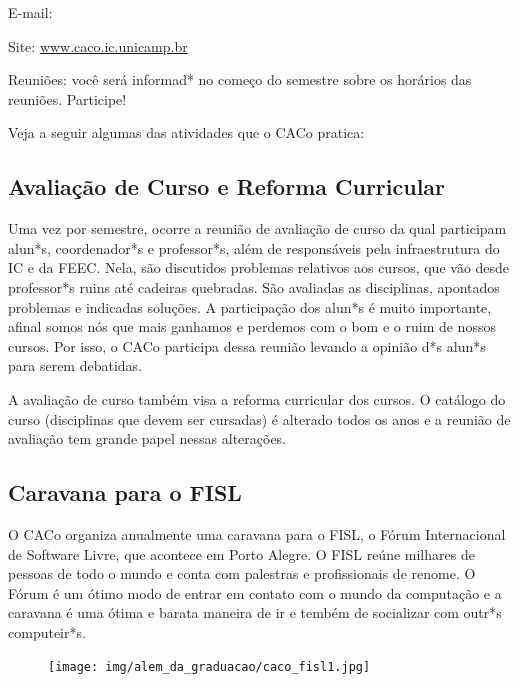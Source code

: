 \begin{compactitemize}
    \item  E-mail: 
    \item  Site: \url{www.caco.ic.unicamp.br}
    \item  Reuniões: você será informad* no começo do semestre sobre os horários
        das reuniões. Participe!
\end{compactitemize}

Veja a seguir algumas das atividades que o CACo pratica:

\subsection{Avaliação de Curso e Reforma Curricular}

Uma vez por semestre, ocorre a reunião de avaliação de curso da qual participam
alun*s, coordenador*s e professor*s, além de responsáveis pela infraestrutura do
IC e da FEEC. Nela, são discutidos problemas relativos aos cursos, que vão desde
professor*s ruins até cadeiras quebradas. São avaliadas as disciplinas,
apontados problemas e indicadas soluções. A participação dos alun*s é muito
importante, afinal somos nós que mais ganhamos e perdemos com o bom e o ruim de
nossos cursos. Por isso, o CACo participa dessa reunião levando a opinião d*s
alun*s para serem debatidas.

A avaliação de curso também visa a reforma curricular dos cursos. O catálogo do
curso (disciplinas que devem ser cursadas) é alterado todos os anos e a reunião
de avaliação tem grande papel nessas alterações.

\subsection{Caravana para o FISL}

O CACo organiza anualmente uma caravana para o FISL, o Fórum Internacional de
Software Livre, que acontece em Porto Alegre. O FISL reúne milhares de pessoas
de todo o mundo e conta com palestras e profissionais de renome. O Fórum é um
ótimo modo de entrar em contato com o mundo da computação e a caravana é uma
ótima e barata maneira de ir e tembém de socializar com outr*s computeir*s.

\begin{figure}[H]
    \centering
    \texttt{[image: img/alem\_da\_graduacao/caco\_fisl1.jpg]}
\end{figure}

